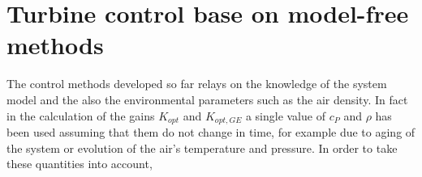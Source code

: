 \section{Turbine control base on model-free methods}\label{sec:c_other_controls}
The control methods developed so far relays on the knowledge of the system model and the also the environmental parameters such as the air density. In fact in the calculation of the gains $K_{opt}$ and $K_{opt,GE}$ a single value of $c_P$ and $\rho$ has been used assuming that them do not change in time, for example due to aging of the system or evolution of the air's temperature and pressure. In order to take these quantities into account,  

